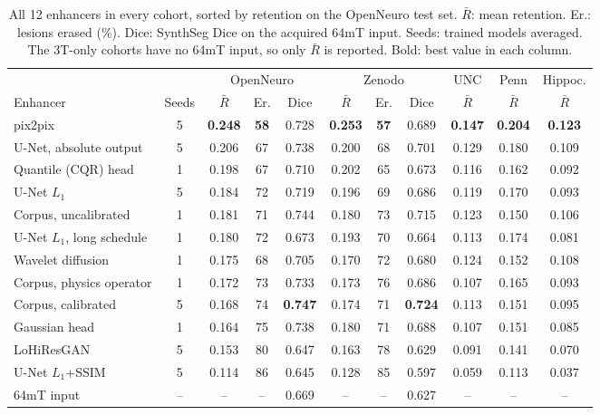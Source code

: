 \begin{table}[!htbp]
{\caption{All 12 enhancers in every cohort, sorted by retention on the OpenNeuro test set. $\bar R$: mean retention. Er.: lesions erased (\%). Dice: SynthSeg Dice on the acquired 64mT input. Seeds: trained models averaged. The 3T-only cohorts have no 64mT input, so only $\bar R$ is reported. Bold: best value in each column.}}
{\scriptsize\setlength{\tabcolsep}{3pt}\begin{tabular*}{\linewidth}{@{\extracolsep{\fill}}lcccccccccc@{}}
\toprule
 & & \multicolumn{3}{c}{OpenNeuro} & \multicolumn{3}{c}{Zenodo} & UNC & Penn & Hippoc. \\
\cmidrule(lr){3-5}\cmidrule(lr){6-8}\cmidrule(lr){9-9}\cmidrule(lr){10-10}\cmidrule(lr){11-11}
Enhancer & Seeds & $\bar R$ & Er. & Dice & $\bar R$ & Er. & Dice & $\bar R$ & $\bar R$ & $\bar R$ \\
\midrule
pix2pix & 5 & \textbf{0.248} & \textbf{58} & 0.728 & \textbf{0.253} & \textbf{57} & 0.689 & \textbf{0.147} & \textbf{0.204} & \textbf{0.123} \\
U-Net, absolute output & 5 & 0.206 & 67 & 0.738 & 0.200 & 68 & 0.701 & 0.129 & 0.180 & 0.109 \\
Quantile (CQR) head & 1 & 0.198 & 67 & 0.710 & 0.202 & 65 & 0.673 & 0.116 & 0.162 & 0.092 \\
U-Net $L_1$ & 5 & 0.184 & 72 & 0.719 & 0.196 & 69 & 0.686 & 0.119 & 0.170 & 0.093 \\
Corpus, uncalibrated & 1 & 0.181 & 71 & 0.744 & 0.180 & 73 & 0.715 & 0.123 & 0.150 & 0.106 \\
U-Net $L_1$, long schedule & 1 & 0.180 & 72 & 0.673 & 0.193 & 70 & 0.664 & 0.113 & 0.174 & 0.081 \\
Wavelet diffusion & 1 & 0.175 & 68 & 0.705 & 0.170 & 72 & 0.680 & 0.124 & 0.152 & 0.108 \\
Corpus, physics operator & 1 & 0.172 & 73 & 0.733 & 0.173 & 76 & 0.686 & 0.107 & 0.165 & 0.093 \\
Corpus, calibrated & 5 & 0.168 & 74 & \textbf{0.747} & 0.174 & 71 & \textbf{0.724} & 0.113 & 0.151 & 0.095 \\
Gaussian head & 1 & 0.164 & 75 & 0.738 & 0.180 & 71 & 0.688 & 0.107 & 0.151 & 0.085 \\
LoHiResGAN & 5 & 0.153 & 80 & 0.647 & 0.163 & 78 & 0.629 & 0.091 & 0.141 & 0.070 \\
U-Net $L_1$+SSIM & 5 & 0.114 & 86 & 0.645 & 0.128 & 85 & 0.597 & 0.059 & 0.113 & 0.037 \\
\midrule
64mT input & -- & -- & -- & 0.669 & -- & -- & 0.627 & -- & -- & -- \\
\bottomrule
\end{tabular*}}
\end{table}
